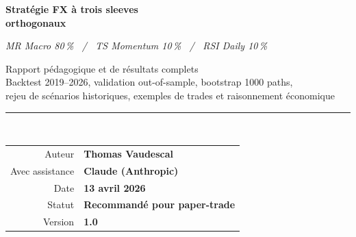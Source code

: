 \documentclass[11pt, a4paper]{scrartcl}
\begin{document}
\begin{titlepage}
\thispagestyle{empty}
\centering

\vspace*{-1.5cm}
\noindent\colorbox{primary}{%
}

\vfill

{\sffamily\color{primary}\Huge\bfseries
Stratégie FX à trois sleeves\\[0.2cm]
orthogonaux
\par}
\vspace{0.8cm}
{\sffamily\color{accent}\LARGE\itshape
MR Macro 80\,\% \, / \, TS Momentum 10\,\% \, / \, RSI Daily 10\,\%
\par}

\vspace{1.5cm}

\begin{minipage}{0.9\textwidth}
\centering
\color{slateGrey}\sffamily\large
Rapport pédagogique et de résultats complets\\[0.3cm]
\small Backtest 2019--2026, validation out-of-sample, bootstrap 1000 paths, \\
rejeu de scénarios historiques, exemples de trades et raisonnement économique
\end{minipage}

\vfill

{\color{accent}\rule{0.6\textwidth}{1.5pt}}\\[0.6cm]

\begin{tabular}{rl}
  \color{slateGrey}\sffamily Auteur & \textbf{Thomas Vaudescal} \\[0.2em]
  \color{slateGrey}\sffamily Avec assistance & \textbf{Claude (Anthropic)} \\[0.2em]
  \color{slateGrey}\sffamily Date & \textbf{13 avril 2026} \\[0.2em]
  \color{slateGrey}\sffamily Statut & \textbf{Recommandé pour paper-trade} \\[0.2em]
  \color{slateGrey}\sffamily Version & \textbf{1.0} \\
\end{tabular}


\end{titlepage}
\end{document}
